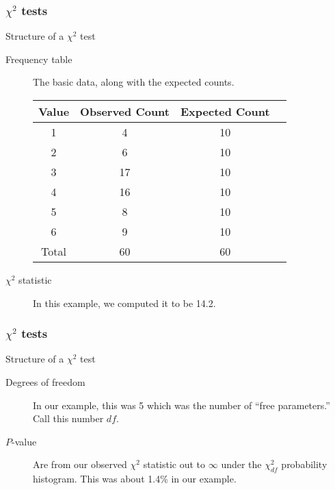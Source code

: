 \documentclass[handout]{beamer}
\begin{document}

   \begin{frame} \frametitle{$\chi^2$ tests}

   \begin{block}
     {Structure of a $\chi^2$ test}
     \begin{description}
     \item[Frequency table] The basic data, along with the expected counts.

     \begin{tabular}{c|c|c|p{1in}}
       {\small Value} & {\small Observed Count} & {\small Expected Count} \\ \hline
       1 & 4 & 10  \\
       2 & 6 & 10 \\
       3 & 17 & 10 \\
       4 & 16 & 10 \\
       5 & 8 & 10  \\
       6 & 9 & 10  \\ \hline
       Total & 60 & 60 \\
     \end{tabular}


     \item[{\color{orange} $\chi^2$} statistic] In this example, we computed it to be 14.2.
     \end{description}
   \end{block}
   \end{frame}


   \begin{frame} \frametitle{$\chi^2$ tests}

   \begin{block}
     {Structure of a $\chi^2$ test}
     \begin{description}
     \item[Degrees of freedom] In our example, this was 5 which was
     the number of ``free parameters.'' Call this number $df$.

     \item[$P$-value] Are from our observed $\chi^2$ statistic out to
     $\infty$
     under the $\chi^2_{df}$ probability histogram. This was about 1.4\% in our example.
     \end{description}
   \end{block}
   \end{frame}
\end{document}

